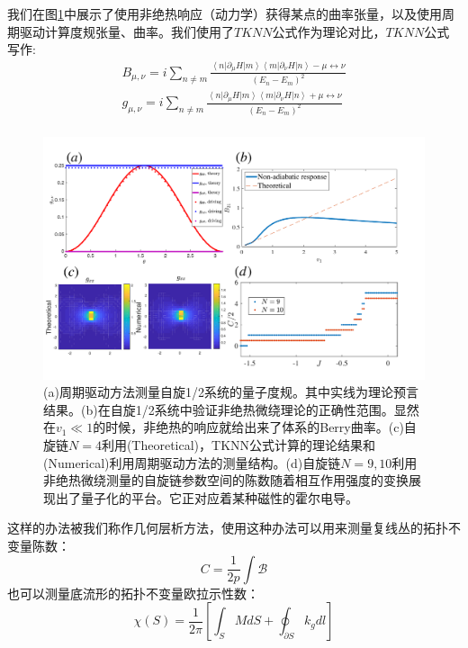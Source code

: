 \documentclass[supercite]{HustGraduPaper}
\newcommand{\bra}[1]{\left\langle #1 \right|}
\newcommand{\ket}[1]{\left| #1 \right\rangle}
\begin{document}
   我们在图\ref{fig:periodic}中展示了使用非绝热响应（动力学）获得某点的曲率张量，以及使用周期驱动计算度规张量、曲率。我们使用了$TKNN$公式作为理论对比，$TKNN$公式写作:
   \begin{equation}
   \begin{aligned}
   B_{\mu,\nu} = i\sum_{n \ne m} \frac{\bra{n}\partial_\mu H \ket{m}\bra{m}\partial_\nu H \ket{n} - \mu \leftrightarrow \nu}{(E_n - E_m)^2}\\
   g_{\mu,\nu} = i\sum_{n \ne m} \frac{\bra{n}\partial_\mu H \ket{m}\bra{m}\partial_\nu H \ket{n} + \mu \leftrightarrow \nu}{(E_n - E_m)^2}\\
   \end{aligned}
   \end{equation}
   
   
   
\begin{figure}
	\centering
	\includegraphics[width=1\linewidth]{Figures/periodic}
	\caption{(a)周期驱动方法测量自旋1/2系统的量子度规。其中实线为理论预言结果。(b)在自旋1/2系统中验证非绝热微绕理论的正确性范围。显然在$v_1 \ll 1$的时候，非绝热的响应就给出来了体系的Berry曲率。(c)自旋链$N=4$利用(Theoretical)，TKNN公式计算的理论结果和(Numerical)利用周期驱动方法的测量结构。(d)自旋链$N = 9,10$利用非绝热微绕测量的自旋链参数空间的陈数随着相互作用强度的变换展现出了量子化的平台。它正对应着某种磁性的霍尔电导。}
	\label{fig:periodic}
\end{figure}
   
   这样的办法被我们称作几何层析方法，使用这种办法可以用来测量复线丛的拓扑不变量陈数：
   \begin{equation}
   C = \frac{1}{2p} \int \mathcal{B}
   \end{equation}
   也可以测量底流形的拓扑不变量欧拉示性数：
\begin{equation}
\chi(S) = \frac{1}{2\pi}[\int_S MdS + \oint_{\partial S}k_gdl]
\end{equation}
\end{document}
